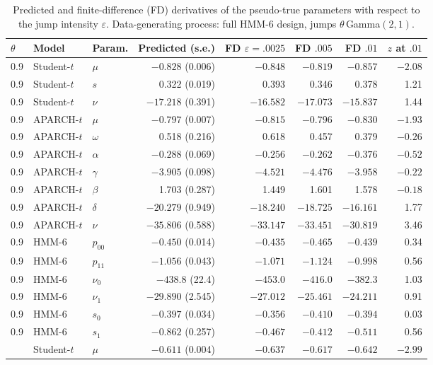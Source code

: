 \documentclass[11pt,a4paper]{article}
\theoremstyle{definition}
\theoremstyle{remark}
\begin{document}
\begin{table}[ht]\centering\footnotesize\setlength{\tabcolsep}{4pt}
\caption{Predicted and finite-difference (FD) derivatives of the pseudo-true parameters with respect to the jump intensity $\varepsilon$. Data-generating process: full HMM-6 design, jumps $\theta\,$Gamma$(2,1)$.}\label{tab:cross}
\begin{tabular}{lllrrrrr}
\toprule
$\theta$ & Model & Param. & Predicted (s.e.) & FD $\varepsilon{=}.0025$ & FD $.005$ & FD $.01$ & $z$ at $.01$\\
\midrule
0.9 & Student-$t$ & $\mu$ & $-0.828$ (0.006) & $-0.848$ & $-0.819$ & $-0.857$ & $-2.08$\\
0.9 & Student-$t$ & $s$ & 0.322 (0.019) & 0.393 & 0.346 & 0.378 & 1.21\\
0.9 & Student-$t$ & $\nu$ & $-17.218$ (0.391) & $-16.582$ & $-17.073$ & $-15.837$ & 1.44\\
0.9 & APARCH-$t$ & $\mu$ & $-0.797$ (0.007) & $-0.815$ & $-0.796$ & $-0.830$ & $-1.93$\\
0.9 & APARCH-$t$ & $\omega$ & 0.518 (0.216) & 0.618 & 0.457 & 0.379 & $-0.26$\\
0.9 & APARCH-$t$ & $\alpha$ & $-0.288$ (0.069) & $-0.256$ & $-0.262$ & $-0.376$ & $-0.52$\\
0.9 & APARCH-$t$ & $\gamma$ & $-3.905$ (0.098) & $-4.521$ & $-4.476$ & $-3.958$ & $-0.22$\\
0.9 & APARCH-$t$ & $\beta$ & 1.703 (0.287) & 1.449 & 1.601 & 1.578 & $-0.18$\\
0.9 & APARCH-$t$ & $\delta$ & $-20.279$ (0.949) & $-18.240$ & $-18.725$ & $-16.161$ & 1.77\\
0.9 & APARCH-$t$ & $\nu$ & $-35.806$ (0.588) & $-33.147$ & $-33.451$ & $-30.819$ & 3.46\\
0.9 & HMM-6 & $p_{00}$ & $-0.450$ (0.014) & $-0.435$ & $-0.465$ & $-0.439$ & 0.34\\
0.9 & HMM-6 & $p_{11}$ & $-1.056$ (0.043) & $-1.071$ & $-1.124$ & $-0.998$ & 0.56\\
0.9 & HMM-6 & $\nu_0$ & $-438.8$ (22.4) & $-453.0$ & $-416.0$ & $-382.3$ & 1.03\\
0.9 & HMM-6 & $\nu_1$ & $-29.890$ (2.545) & $-27.012$ & $-25.461$ & $-24.211$ & 0.91\\
0.9 & HMM-6 & $s_0$ & $-0.397$ (0.034) & $-0.356$ & $-0.410$ & $-0.394$ & 0.03\\
0.9 & HMM-6 & $s_1$ & $-0.862$ (0.257) & $-0.467$ & $-0.412$ & $-0.511$ & 0.56\\
\addlinespace
0.4 & Student-$t$ & $\mu$ & $-0.611$ (0.004) & $-0.637$ & $-0.617$ & $-0.642$ & $-2.99$\\

\end{tabular}
\end{table}
\end{document}
